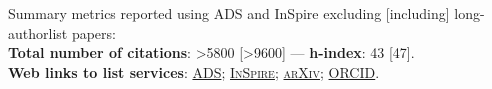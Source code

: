 Summary metrics reported using ADS and InSpire excluding [including] long-authorlist papers:
\\
\textcolor{mark_color}{\textbf{Total number of citations}}: >5800 [>9600]
 --- 
\textcolor{mark_color}{\textbf{h-index}}: 43 [47].
\\
\textcolor{mark_color}{\textbf{Web links to list services}}:
\href{https://davidegerosa.com/myads}{\textsc{ADS}};
\href{https://davidegerosa.com/myinspire}{\textsc{InSpire}};
\href{http://davidegerosa.com/myarxiv}{\textsc{arXiv}};
\href{https://davidegerosa.com/myorcid}{\textsc{ORCID}}.